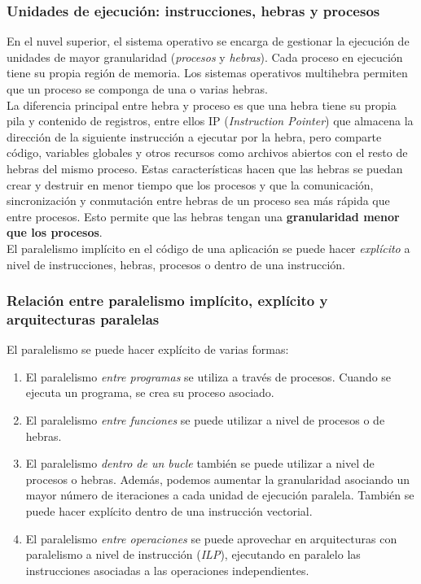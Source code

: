 \documentclass[12pt,spanish]{article}
\begin{document}
\subsubsection{Unidades de ejecución: instrucciones, hebras y procesos}

En el nuvel superior, el sistema operativo se encarga de gestionar la ejecución de unidades de mayor granularidad (\textit{procesos} y \textit{hebras}). Cada proceso en ejecución tiene su propia región de memoria. Los sistemas operativos multihebra permiten que un proceso se componga de una o varias hebras.\\
La diferencia principal entre hebra y proceso es que una hebra tiene su propia pila y contenido de registros, entre ellos IP (\textit{Instruction Pointer}) que almacena la dirección de la siguiente instrucción a ejecutar por la hebra, pero comparte código, variables globales y otros recursos como archivos abiertos con el resto de hebras del mismo proceso. Estas características hacen que las hebras se puedan crear y destruir en menor tiempo que los procesos y que la comunicación, sincronización y conmutación entre hebras de un proceso sea más rápida que entre procesos. Esto permite que las hebras tengan una \textbf{granularidad menor que los procesos}.\\
El paralelismo implícito en el código de una aplicación se puede hacer \emph{explícito} a nivel de instrucciones, hebras, procesos o dentro de una instrucción.
\newpage
\subsubsection{Relación entre paralelismo implícito, explícito y arquitecturas paralelas}

El paralelismo se puede hacer explícito de varias formas:
\begin{enumerate}
\item El paralelismo \emph{entre programas} se utiliza a través de procesos. Cuando se ejecuta un programa, se crea su proceso asociado.
\item El paralelismo \emph{entre funciones} se puede utilizar a nivel de procesos o de hebras.
\item El paralelismo \emph{dentro de un bucle} también se puede utilizar a nivel de procesos o hebras. Además, podemos aumentar la granularidad asociando un mayor número de iteraciones a cada unidad de ejecución paralela. También se puede hacer explícito dentro de una instrucción vectorial.
\item El paralelismo \emph{entre operaciones} se puede aprovechar en arquitecturas con paralelismo a nivel de instrucción (\textit{ILP}), ejecutando en paralelo las instrucciones asociadas a las operaciones independientes.
\end{enumerate}
\end{document}
